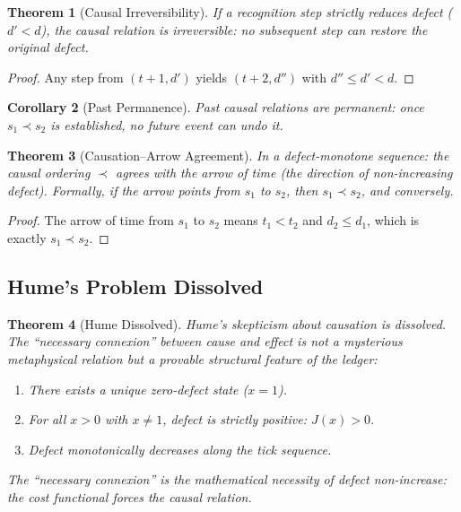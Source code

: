 \documentclass[12pt,a4paper]{article}
\newtheorem{theorem}{Theorem}[section]
\newtheorem{corollary}[theorem]{Corollary}
\theoremstyle{definition}
\theoremstyle{remark}
\begin{document}
\begin{theorem}[Causal Irreversibility]
\label{thm:irrev}
If a recognition step strictly reduces defect ($d' < d$), the causal
relation is irreversible: no subsequent step can restore the original
defect.
\end{theorem}

\begin{proof}
Any step from $(t{+}1, d')$ yields $(t{+}2, d'')$ with
$d'' \leq d' < d$.
\end{proof}

\begin{corollary}[Past Permanence]
\label{cor:past}
Past causal relations are permanent: once $s_1 \prec s_2$ is
established, no future event can undo it.
\end{corollary}

\begin{theorem}[Causation--Arrow Agreement]
\label{thm:arrow-agree}
In a defect-monotone sequence: the causal ordering $\prec$ agrees with
the arrow of time (the direction of non-increasing defect).  Formally,
if the arrow points from $s_1$ to $s_2$, then $s_1 \prec s_2$, and
conversely.
\end{theorem}

\begin{proof}
The arrow of time from $s_1$ to $s_2$ means $t_1 < t_2$ and
$d_2 \leq d_1$, which is exactly $s_1 \prec s_2$.
\end{proof}

\subsection{Hume's Problem Dissolved}

\begin{theorem}[Hume Dissolved]
\label{thm:hume}
Hume's skepticism about causation is dissolved.  The ``necessary
connexion'' between cause and effect is not a mysterious metaphysical
relation but a provable structural feature of the ledger:
\begin{enumerate}[label=(\roman*),nosep]
  \item There exists a unique zero-defect state ($x = 1$).
  \item For all $x > 0$ with $x \neq 1$, defect is strictly positive:
  $J(x) > 0$.
  \item Defect monotonically decreases along the tick sequence.
\end{enumerate}
The ``necessary connexion'' is the mathematical necessity of defect
non-increase: the cost functional \emph{forces} the causal relation.
\end{theorem}
\end{document}

